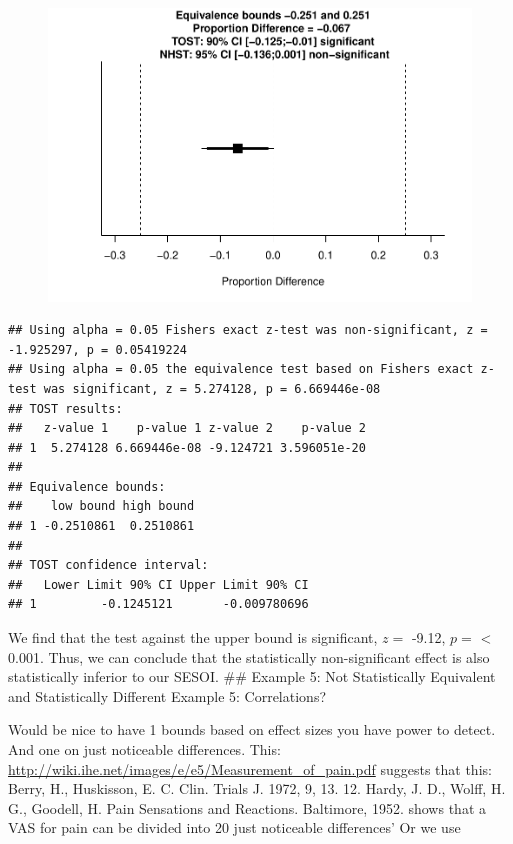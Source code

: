 \documentclass[english,man]{apa6}
\theoremstyle{definition}
\theoremstyle{definition}
\theoremstyle{definition}
\theoremstyle{remark}
\begin{document}
\begin{figure}[htbp]
\centering
\includegraphics{manuscript_files/figure-latex/unnamed-chunk-10-1.pdf}
\caption{}
\end{figure}

\begin{verbatim}
## Using alpha = 0.05 Fishers exact z-test was non-significant, z = -1.925297, p = 0.05419224
## Using alpha = 0.05 the equivalence test based on Fishers exact z-test was significant, z = 5.274128, p = 6.669446e-08
## TOST results:
##   z-value 1    p-value 1 z-value 2    p-value 2
## 1  5.274128 6.669446e-08 -9.124721 3.596051e-20
## 
## Equivalence bounds:
##    low bound high bound
## 1 -0.2510861  0.2510861
## 
## TOST confidence interval:
##   Lower Limit 90% CI Upper Limit 90% CI
## 1         -0.1245121       -0.009780696
\end{verbatim}

We find that the test against the upper bound is significant, \(z =\)
-9.12, \(p =\) \textless{} 0.001. Thus, we can conclude that the
statistically non-significant effect is also statistically inferior to
our SESOI. \#\# Example 5: Not Statistically Equivalent and
Statistically Different Example 5: Correlations?

Would be nice to have 1 bounds based on effect sizes you have power to
detect. And one on just noticeable differences. This:
\url{http://wiki.ihe.net/images/e/e5/Measurement_of_pain.pdf} suggests
that this: Berry, H., Huskisson, E. C. Clin. Trials J. 1972, 9, 13. 12.
Hardy, J. D., Wolff, H. G., Goodell, H. Pain Sensations and Reactions.
Baltimore, 1952. shows that a VAS for pain can be divided into 20 just
noticeable differences' Or we use
\end{document}

